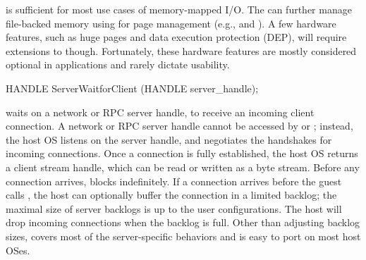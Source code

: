  is sufficient for most use cases of memory-mapped I/O. The \libos{} can further manage file-backed memory using \hostapis{} for page management (e.g.,  and ). A few hardware features, such as huge pages and data execution protection (DEP), will require extensions to \thehostabi{} though.
Fortunately, these hardware features are mostly considered optional in applications
and rarely dictate usability.














\begin{paldef}
HANDLE ServerWaitforClient (HANDLE server_handle);
\end{paldef} 


 waits on a network or RPC server handle, %
to receive an incoming client connection.
A network or RPC server handle cannot be accessed by  or ;
instead, the host OS listens on the server handle,
and negotiates the handshakes for incoming connections.
Once a connection is fully established,
the host OS returns a client stream handle, which can be read or written as a byte stream.
Before any connection arrives,  blocks indefinitely.
If a connection arrives before the guest calls ,
the host can optionally buffer the connection in a limited backlog; the maximal size of server backlogs is up to the user configurations. The host will drop incoming connections when the backlog is full.
Other than adjusting backlog sizes,  covers most of the server-specific behaviors
and is easy to port on most host OSes.












